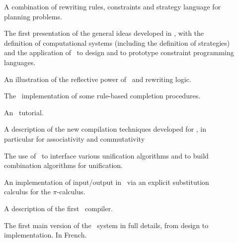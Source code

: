 \begin{description}
\item[
\cite{DuboisKirchner-Ercim99}
]
A combination of rewriting rules, constraints and strategy language for planning problems.

\item[
\cite{KirchnerKV-MIT95}
] 
The first presentation of the general
ideas developed in \elan, with the definition of computational
systems (including the definition of strategies) and the application
of \elan\ to design and to prototype constraint programming languages.


\item[
\cite{Reflection-RwLg1996}
] 
An illustration of the reflective power of \elan\ and rewriting logic.

\item[
\cite{KirchnerM-RTA95}
] 
The \elan\ implementation of some rule-based completion
procedures.

\item[
\cite{Kirchner-JFPLC99}
]
An \ELAN\ tutorial.


\item[
\cite{MoreauK-ASF+SDF97,MoreauK-PLILP+ALP98,KirchnerM-98,MoreauThese99}
]
A description of the new compilation techniques developed for \elan, in
particular for associativity and commutativity


\item[
\cite{Ringeissen-RTA97}
]
The use of \elan\ to interface various unification algorithms
and to build combination algorithms for unification.

\item[
\cite{Viry-RwLg1996}
] 
An implementation of input/output in \elan\ via an explicit
substitution calculus for the $\pi$-calculus.

\item[ \cite{Vittek-RTA96} 
] 
A description of the first \elan\ compiler.

\item[
\cite{VittekThese}
] 
The first main version of the \elan\ system in full details, from
design to implementation. In French. 


\end{description}

